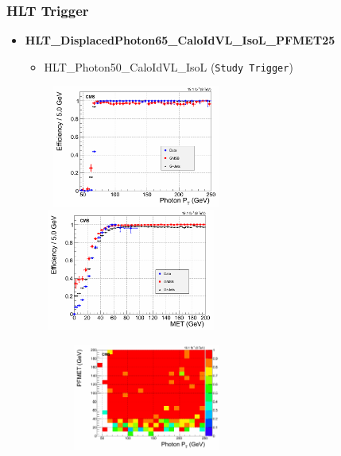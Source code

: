 \documentclass{beamer}
\begin{document}
 \begin{frame}
 \frametitle{HLT Trigger}
  \begin{minipage}[b]{\linewidth}
    \begin{itemize}
     \item \textbf{HLT\_DisplacedPhoton65\_CaloIdVL\_IsoL\_PFMET25}%
     \begin{itemize}
        \item  HLT\_Photon50\_CaloIdVL\_IsoL (\texttt{Study Trigger})
     \end{itemize}
   \end{itemize}  
  \end{minipage}
  
  
 \vspace{-0.2cm}
 \begin{minipage}[b]{0.7\paperwidth}
\flushleft
    \begin{figure}[htbp]
 \mbox{
   \includegraphics[height=4.0cm,width=0.55\textwidth]{THESISPLOTS/Photon_EffAsym.png}
   \includegraphics[height=4.0cm,width=0.55\textwidth]{THESISPLOTS/PFMET_EffAsym.png} }
   \end{figure}    
\end{minipage}  
\centering
\includegraphics[height=3.5cm,width=0.70\textwidth]{THESISPLOTS/Eff2D.png} 
  
  
\end{frame}
\end{document}
